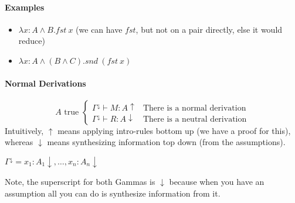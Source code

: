 \documentclass[12 pt]{article}
\begin{document}
          \paragraph{Examples}
          \begin{itemize}
          \item $\lambda x : A \land B.fst \ x$ (we can have $fst$, but
            not on a pair directly, else it would reduce)
          \item $\lambda x : A \land (B \land C). snd\ (fst\ x)$
          \end{itemize}
          \paragraph{Normal Derivations}
          \begin{equation*}
            A \text{ true }
            \begin{cases}
              \Gamma^{\downarrow} \vdash M:A \uparrow & \text{There is a normal derivation} 
              \\ \Gamma^{\downarrow} \vdash R: A \downarrow & \text{There is a neutral derivation}
            \end{cases}
          \end{equation*}
          Intuitively, $\uparrow$ means applying intro-rules bottom
          up (we have a proof for this), whereas $\downarrow$ means
          synthesizing information top
          down (from the assumptions).

          $\Gamma^{\downarrow} = x_1:A_1\downarrow, \ldots, x_n : A_n
          \downarrow$

          Note, the superscript for both Gammas is $\downarrow$
          because when you have an assumption all you can do is
          synthesize information from it.
\end{document}
